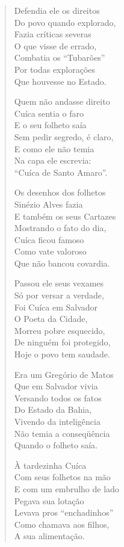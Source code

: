 \begin{verse}
Defendia ele os direitos \\
Do povo quando explorado, \\
Fazia críticas severas \\
O que visse de errado, \\
Combatia os ``Tubarões'' \\
Por todas explorações \\
Que houvesse no Estado. 


Quem não andasse direito \\
Cuíca sentia o faro \\
E o seu folheto saía \\
Sem pedir segredo, é claro, \\
E como ele não temia \\
Na capa ele escrevia: \\
``Cuíca de Santo Amaro''. 

Os desenhos dos folhetos \\
Sinézio Alves fazia \\
E também os seus Cartazes \\
Mostrando o fato do dia, \\
Cuíca ficou famoso \\
Como vate valoroso \\
Que não bancou covardia. 

Passou ele seus vexames \\
Só por versar a verdade, \\
Foi Cuíca em Salvador \\
O Poeta da Cidade, \\
Morreu pobre esquecido, \\
De ninguém foi protegido, \\
Hoje o povo tem saudade. 

Era um Gregório de Matos \\
Que em Salvador vivia \\
Versando todos os fatos \\
Do Estado da Bahia, \\
Vivendo da inteligência \\
Não temia a conseqüência \\
Quando o folheto saía. 


À tardezinha Cuíca \\
Com seus folhetos na mão \\
E com um embrulho de lado \\
Pegava sua lotação \\
Levava pros ``enchadinhos'' \\
Como chamava aos filhos, \\
A sua alimentação. 


\end{verse}
